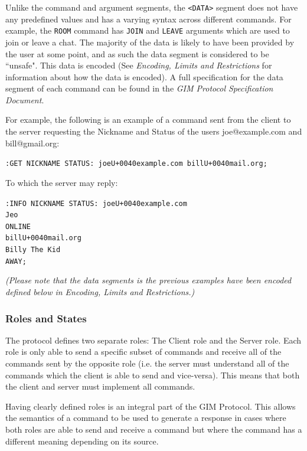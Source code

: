Unlike the command and argument segments, the \texttt{<DATA>} segment does not have any predefined values and has a varying syntax across different commands.  For example, the \texttt{ROOM} command has \texttt{JOIN} and \texttt{LEAVE} arguments which are used to join or leave a chat. The majority of the data is likely to have been provided by the user at some point, and as such the data segment is considered to be ``unsafe". This data is encoded (See \emph{Encoding, Limits and Restrictions} for information about how the data is encoded). A full specification for the data segment of each command can be found in the \emph{GIM Protocol Specification Document}.

For example, the following is an example of a command sent from the client to the server requesting the Nickname and Status of the users joe@example.com and bill@gmail.org:

\texttt{:GET NICKNAME STATUS: joe\SLASH U+0040example.com bill\SLASH U+0040mail.org;}

To which the server may reply:

\texttt{:INFO NICKNAME STATUS: joe\SLASH U+0040example.com\\
Jeo\\
ONLINE\\
bill\SLASH U+0040mail.org\\
Billy The Kid\\
AWAY;}

\emph{(Please note that the data segments is the previous examples have been encoded  defined below in Encoding, Limits and Restrictions.)}

\subsubsection{Roles and States}

The protocol defines two separate roles: The Client role and the Server role. Each role is only able to send a specific subset of commands and receive all of the commands sent by the opposite role (i.e. the server must understand all of the commands which the client is able to send and vice-versa). This means that both the client and server must implement all commands.

Having clearly defined roles is an integral part of the GIM Protocol. This allows the semantics of a command to be used to generate a response in cases where both roles are able to send and receive a command but where the command has a different meaning depending on its source. 

